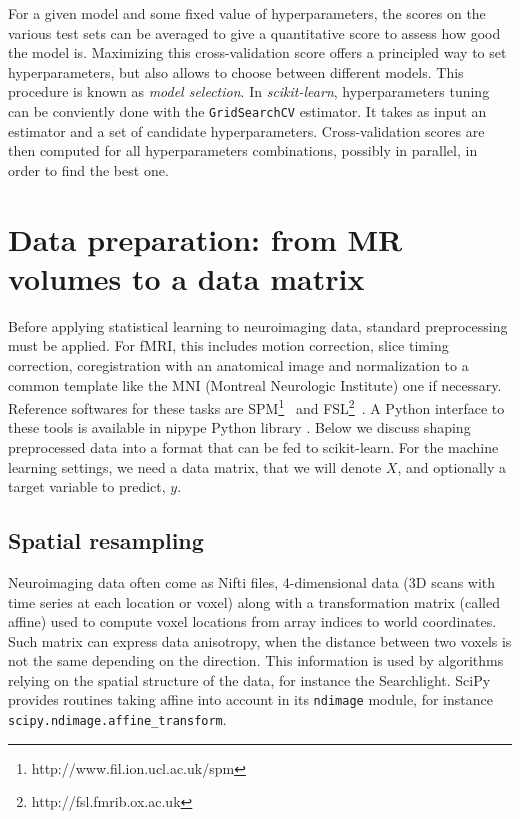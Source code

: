 \documentclass{frontiersSCNS} %
\begin{document}
For a given model and some fixed value of hyperparameters, the scores
on the various test sets can be averaged to give a quantitative score
to assess how good the model is. Maximizing this cross-validation score offers
a principled way to set hyperparameters, but also allows to choose between
different models. This procedure is known as \emph{model selection}.
%
In {\em scikit-learn}, hyperparameters tuning can be conviently done with the
\texttt{GridSearchCV} estimator. It takes as input an estimator and
a set of candidate hyperparameters. Cross-validation scores are then
computed for all hyperparameters combinations, possibly in parallel,
in order to find the best one.

\section{Data preparation: from MR volumes to a data matrix}
\label{data_preparation}
Before applying statistical learning to neuroimaging data, standard
preprocessing must be applied. For fMRI, this includes motion
correction, slice timing correction, coregistration with an anatomical image and normalization to a common
template like the MNI (Montreal Neurologic Institute) one if necessary.
Reference softwares for these tasks are
SPM\footnote{http://www.fil.ion.ucl.ac.uk/spm}~\citep{friston2007} and
FSL\footnote{http://fsl.fmrib.ox.ac.uk}~\citep{smith2004}. A Python
interface to these tools is available in nipype Python library
\citep{gorgolewski2011}. Below we discuss shaping preprocessed data into
a format that can be fed to scikit-learn. For the machine learning
settings, we need a data matrix, that we will denote $X$, and optionally a
target variable to predict, $y$.

\subsection{Spatial resampling}
\label{resampling}

Neuroimaging data often come as Nifti files, 4-dimensional data (3D scans
with time series at each location or voxel) along with a
transformation matrix (called affine) used to compute voxel locations
from array indices to world coordinates. Such matrix can express data
anisotropy, when the distance between two voxels is not the same
depending on the direction. This information is used by algorithms
relying on the spatial structure of the data, for instance the
Searchlight. SciPy provides routines taking affine into account in its
\texttt{ndimage} module, for instance \texttt{scipy.ndimage.affine\_transform}.
\end{document}
